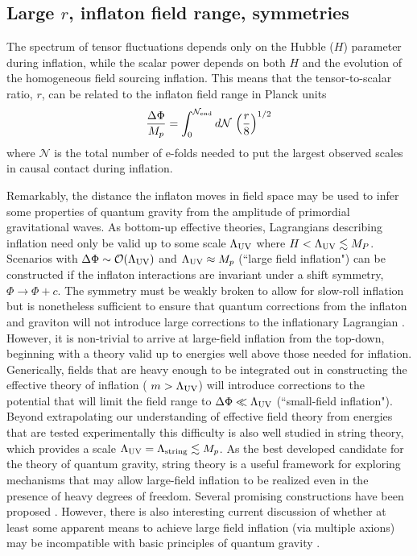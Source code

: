 \subsection{Large $r$, inflaton field range, symmetries}
The spectrum of tensor fluctuations depends only on the Hubble ($H$) parameter during inflation, while the scalar power depends on both $H$ and the evolution of the homogeneous field sourcing inflation. This means that the tensor-to-scalar ratio, $r$, can be related to the inflaton field range in Planck units \cite{Lyth:1996im}
\begin{equation}
\label{eq:Lyth}
\frac{\Delta\Phi}{M_p}=\int_0^{\mathcal{N}_{\rm end}}d\mathcal{N}\,\left(\frac{r}{8}\right)^{1/2}
\end{equation}
where $\mathcal{N}$ is the total number of e-folds needed to put the largest observed scales in causal contact during inflation.

Remarkably, the distance the inflaton moves in field space may be used to infer some properties of quantum gravity from the amplitude of primordial gravitational waves. As bottom-up effective theories, Lagrangians describing inflation need only be valid up to some scale $\Lambda_{\rm UV}$ where $H<\Lambda_{\rm UV}\lesssim M_P$. Scenarios with $\Delta\Phi\sim\mathcal{O}(\Lambda_{\rm UV})$ and $\Lambda_{\rm UV}\approx M_p$ (``large field inflation") can be constructed if the inflaton interactions are invariant under a shift symmetry, $\Phi\rightarrow\Phi+c$. The symmetry must be weakly broken to allow for slow-roll inflation but is nonetheless sufficient to ensure that quantum corrections from the inflaton and graviton will not introduce large corrections to the inflationary Lagrangian \cite{Linde:2005ht, Kaloper:2011jz, Csaki:2014bua,Kaplan:2015fuy,Choi:2015fiu}. However, it is non-trivial to arrive at large-field inflation from the top-down, beginning with a theory valid up to energies well above those needed for inflation. Generically, fields that are heavy enough to be integrated out in constructing the effective theory of inflation ( $m>\Lambda_{\rm UV}$) will introduce corrections to the potential that will limit the field range to $\Delta\Phi\ll\Lambda_{\rm UV}$ (``small-field inflation"). Beyond extrapolating our understanding of effective field theory from energies that are tested experimentally this difficulty is also well studied in string theory, which provides a scale $\Lambda_{\rm UV}=\Lambda_{\rm string}\lesssim M_p$. As the best developed candidate for the theory of quantum gravity, string theory is a useful framework for exploring mechanisms that may allow large-field inflation to be realized even in the presence of heavy degrees of freedom. Several promising constructions have been proposed \cite{Silverstein:2008sg, McAllister:2008hb, Berg:2009tg, Palti:2014kza,McAllister:2014mpa, Marchesano:2014mla, Blumenhagen:2015xpa}. However, there is also interesting current discussion of whether at least some apparent means to achieve large field inflation (via multiple axions) may be incompatible with basic principles of quantum gravity \cite{delaFuente:2014aca,Bachlechner:2015qja,Heidenreich:2015wga,Kooner:2015rza}. 

